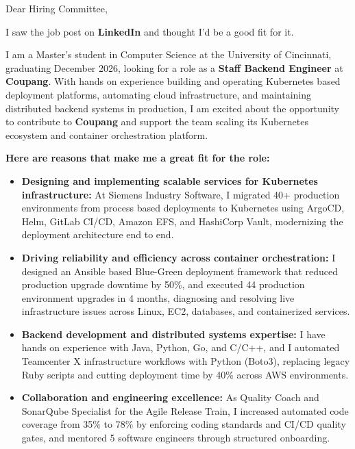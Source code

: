 \documentclass[11pt]{letter}
\date{}
\begin{document}
\begin{letter}{}

\opening{Dear Hiring Committee,}

I saw the job post on \textbf{LinkedIn} and thought I'd be a good fit for it.

I am a Master's student in Computer Science at the University of Cincinnati, graduating December 2026, looking for a role as a \textbf{Staff Backend Engineer} at \textbf{Coupang}. With hands on experience building and operating Kubernetes based deployment platforms, automating cloud infrastructure, and maintaining distributed backend systems in production, I am excited about the opportunity to contribute to \textbf{Coupang} and support the team scaling its Kubernetes ecosystem and container orchestration platform.

\textbf{Here are reasons that make me a great fit for the role:}

\begin{itemize}[leftmargin=*, itemsep=0.45em]
    \item \textbf{Designing and implementing scalable services for Kubernetes infrastructure:} At Siemens Industry Software, I migrated 40+ production environments from process based deployments to Kubernetes using ArgoCD, Helm, GitLab CI/CD, Amazon EFS, and HashiCorp Vault, modernizing the deployment architecture end to end.

    \item \textbf{Driving reliability and efficiency across container orchestration:} I designed an Ansible based Blue-Green deployment framework that reduced production upgrade downtime by 50\%, and executed 44 production environment upgrades in 4 months, diagnosing and resolving live infrastructure issues across Linux, EC2, databases, and containerized services.

    \item \textbf{Backend development and distributed systems expertise:} I have hands on experience with Java, Python, Go, and C/C++, and I automated Teamcenter X infrastructure workflows with Python (Boto3), replacing legacy Ruby scripts and cutting deployment time by 40\% across AWS environments.

    \item \textbf{Collaboration and engineering excellence:} As Quality Coach and SonarQube Specialist for the Agile Release Train, I increased automated code coverage from 35\% to 78\% by enforcing coding standards and CI/CD quality gates, and mentored 5 software engineers through structured onboarding.
\end{itemize}


\end{letter}
\end{document}
